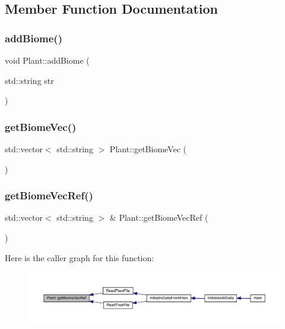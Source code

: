 \subsection{Member Function Documentation}
\mbox{\label{class_plant_a32c7cc807dce6f0049fec8a8576a341d}} 
\subsubsection{\texorpdfstring{add\+Biome()}{addBiome()}}
{\footnotesize\ttfamily void Plant\+::add\+Biome (\begin{DoxyParamCaption}\item[{std\+::string}]{str }\end{DoxyParamCaption})}

\mbox{\label{class_plant_a1c0df266a43944cb5f0565c298259340}} 
\subsubsection{\texorpdfstring{get\+Biome\+Vec()}{getBiomeVec()}}
{\footnotesize\ttfamily std\+::vector$<$ std\+::string $>$ Plant\+::get\+Biome\+Vec (\begin{DoxyParamCaption}{ }\end{DoxyParamCaption})}

\mbox{\label{class_plant_aa8d8046f942713a0d455accd0f86509f}} 
\subsubsection{\texorpdfstring{get\+Biome\+Vec\+Ref()}{getBiomeVecRef()}}
{\footnotesize\ttfamily std\+::vector$<$ std\+::string $>$ \& Plant\+::get\+Biome\+Vec\+Ref (\begin{DoxyParamCaption}{ }\end{DoxyParamCaption})}

Here is the caller graph for this function\+:
\nopagebreak
\begin{figure}[H]
\begin{center}
\leavevmode
\includegraphics[width=350pt]{d7/d0b/class_plant_aa8d8046f942713a0d455accd0f86509f_icgraph}
\end{center}
\end{figure}
\mbox{\label{class_plant_a76c9434c2b7f9a9edad3e07db344ce0f}} 
